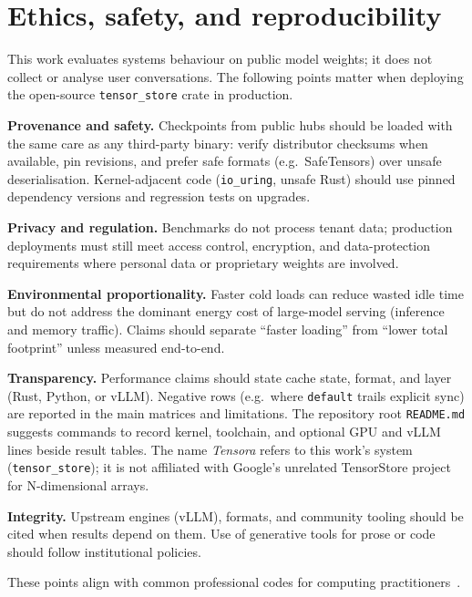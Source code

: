 \section{Ethics, safety, and reproducibility}
\label{sec:professional_issues}

This work evaluates systems behaviour on public model weights; it does not collect or analyse user conversations. The following points matter when deploying the open-source \texttt{tensor\_store} crate in production.

\textbf{Provenance and safety.} Checkpoints from public hubs should be loaded with the same care as any third-party binary: verify distributor checksums when available, pin revisions, and prefer safe formats (e.g.\ SafeTensors) over unsafe deserialisation. Kernel-adjacent code (\texttt{io\_uring}, unsafe Rust) should use pinned dependency versions and regression tests on upgrades.

\textbf{Privacy and regulation.} Benchmarks do not process tenant data; production deployments must still meet access control, encryption, and data-protection requirements where personal data or proprietary weights are involved.

\textbf{Environmental proportionality.} Faster cold loads can reduce wasted idle time but do not address the dominant energy cost of large-model serving (inference and memory traffic). Claims should separate ``faster loading'' from ``lower total footprint'' unless measured end-to-end.

\textbf{Transparency.} Performance claims should state cache state, format, and layer (Rust, Python, or vLLM). Negative rows (e.g.\ where \texttt{default} trails explicit sync) are reported in the main matrices and limitations. The repository root \texttt{README.md} suggests commands to record kernel, toolchain, and optional GPU and vLLM lines beside result tables. The name \emph{Tensora} refers to this work's system (\texttt{tensor\_store}); it is not affiliated with Google's unrelated TensorStore project for N-dimensional arrays.

\textbf{Integrity.} Upstream engines (vLLM), formats, and community tooling should be cited when results depend on them. Use of generative tools for prose or code should follow institutional policies.

These points align with common professional codes for computing practitioners~\cite{bcs_code}.
